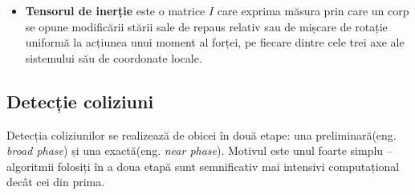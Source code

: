 \documentclass[12pt,a4paper]{report}
\begin{document}
\begin{itemize}
	\label{barycentric_coordinates}
	\item \textbf{Tensorul de inerție} este o matrice $I$ care exprima măsura prin care un corp se opune modificării stării sale de repaus relativ sau de mișcare de rotație uniformă la acțiunea unui moment al forței, pe fiecare dintre cele trei axe ale sistemului său de coordonate locale.
	\label{inertia_tensor}
	
\end{itemize}

\subsection{Detecție coliziuni}
Detecția coliziunilor se realizează de obicei în două etape: una preliminară(eng. \textit{broad phase}) și una exactă(eng. \textit{near phase}). Motivul este unul foarte simplu -- algoritmii folosiți în a doua etapă sunt semnificativ mai intensivi computațional decât cei din prima.
\end{document}
